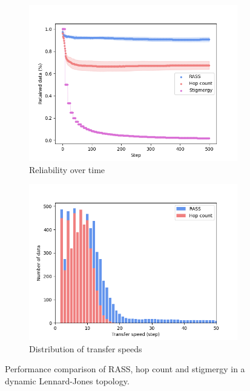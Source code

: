 \begin{figure}
    \centering
    \begin{subfigure}{0.8\textwidth}
        \includegraphics[width=\textwidth]{images/lennard_reliability.png}
        \caption{Reliability over time}
        \label{results:lennard_100_reliability}
    \end{subfigure}
    \begin{subfigure}{0.8\textwidth}
        \includegraphics[width=\textwidth]{images/lennard_speed.png}
        \caption{Distribution of transfer speeds}
        \label{results:lennard_100_speed}
    \end{subfigure}
    \caption{Performance comparison of RASS, hop count and stigmergy in a dynamic Lennard-Jones topology.}
    \label{results:dynamicTopologyLennard}
    \vspace{-2mm}
\end{figure}

